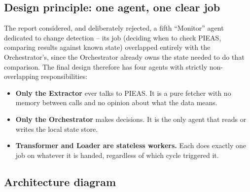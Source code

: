 \documentclass[11pt,a4paper]{article}
\begin{document}
\subsection{Design principle: one agent, one clear job}

The report considered, and deliberately rejected, a fifth ``Monitor'' agent dedicated to change
detection -- its job (deciding when to check PIEAS, comparing results against known state)
overlapped entirely with the Orchestrator's, since the Orchestrator already owns the state
needed to do that comparison. The final design therefore has four agents with strictly
non-overlapping responsibilities:

\begin{itemize}[leftmargin=1.4em]
    \item \textbf{Only the Extractor} ever talks to PIEAS. It is a pure fetcher with no memory
          between calls and no opinion about what the data means.
    \item \textbf{Only the Orchestrator} makes decisions. It is the only agent that reads or
          writes the local state store.
    \item \textbf{Transformer and Loader are stateless workers.} Each does exactly one job on
          whatever it is handed, regardless of which cycle triggered it.
\end{itemize}

\subsection{Architecture diagram}
\end{document}
